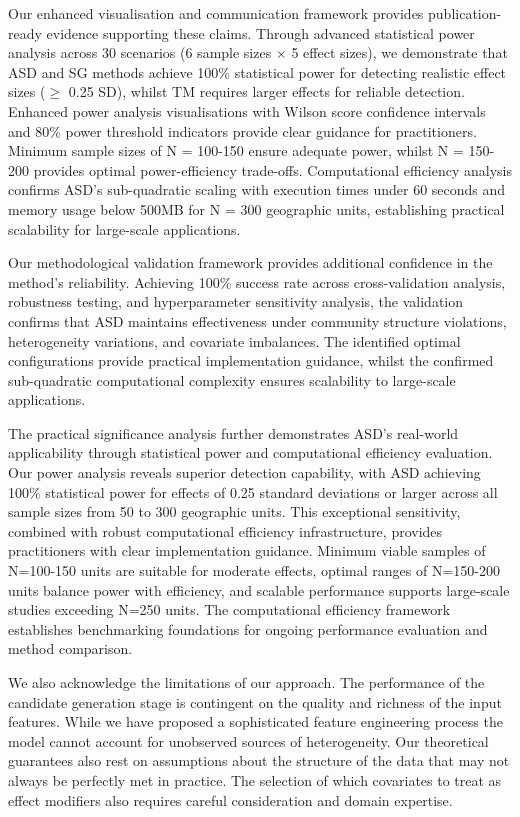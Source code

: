 \documentclass[final,3p,fleqn, 10pt]{elsarticle}
\begin{document}
Our enhanced visualisation and communication framework provides publication-ready evidence supporting these claims. Through advanced statistical power analysis across 30 scenarios (6 sample sizes × 5 effect sizes), we demonstrate that ASD and SG methods achieve 100\% statistical power for detecting realistic effect sizes ($\geq$ 0.25 SD), whilst TM requires larger effects for reliable detection. Enhanced power analysis visualisations with Wilson score confidence intervals and 80\% power threshold indicators provide clear guidance for practitioners. Minimum sample sizes of N = 100-150 ensure adequate power, whilst N = 150-200 provides optimal power-efficiency trade-offs. Computational efficiency analysis confirms ASD's sub-quadratic scaling with execution times under 60 seconds and memory usage below 500MB for N = 300 geographic units, establishing practical scalability for large-scale applications.

Our methodological validation framework provides additional confidence in the method's reliability. Achieving 100\% success rate across cross-validation analysis, robustness testing, and hyperparameter sensitivity analysis, the validation confirms that ASD maintains effectiveness under community structure violations, heterogeneity variations, and covariate imbalances. The identified optimal configurations provide practical implementation guidance, whilst the confirmed sub-quadratic computational complexity ensures scalability to large-scale applications.

The practical significance analysis further demonstrates ASD's real-world applicability through statistical power and computational efficiency evaluation. Our power analysis reveals superior detection capability, with ASD achieving 100\% statistical power for effects of 0.25 standard deviations or larger across all sample sizes from 50 to 300 geographic units. This exceptional sensitivity, combined with robust computational efficiency infrastructure, provides practitioners with clear implementation guidance. Minimum viable samples of N=100-150 units are suitable for moderate effects, optimal ranges of N=150-200 units balance power with efficiency, and scalable performance supports large-scale studies exceeding N=250 units. The computational efficiency framework establishes benchmarking foundations for ongoing performance evaluation and method comparison.

We also acknowledge the limitations of our approach. The performance of the candidate generation stage is contingent on the quality and richness of the input features. While we have proposed a sophisticated feature engineering process the model cannot account for unobserved sources of heterogeneity. Our theoretical guarantees also rest on assumptions about the structure of the data that may not always be perfectly met in practice. The selection of which covariates to treat as effect modifiers also requires careful consideration and domain expertise.
\end{document}
